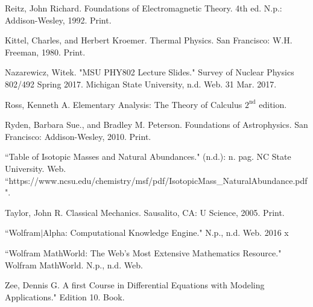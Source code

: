 {\begin{thebibliography}{99}
	 Reitz, John Richard. Foundations of Electromagnetic Theory. 4th ed. N.p.: Addison-Wesley, 1992. Print. 
	
	  Kittel, Charles, and Herbert Kroemer. Thermal Physics. San Francisco: W.H. Freeman, 1980. Print.
	
	 Nazarewicz, Witek. "MSU PHY802 Lecture Slides." Survey of Nuclear Physics 802/492 Spring 2017. Michigan State University, n.d. Web. 31 Mar. 2017. 
	
	 Ross, Kenneth A. Elementary Analysis: The Theory of Calculus $2^{\textrm{nd}}$ edition. 
	
	 Ryden, Barbara Sue., and Bradley M. Peterson. Foundations of Astrophysics. San Francisco: Addison-Wesley, 2010. Print. 
	
	 ``Table of Isotopic Masses and Natural Abundances." (n.d.): n. pag. NC State University. Web. ``https://www.ncsu.edu/chemistry/msf/pdf/IsotopicMass\_NaturalAbundance.pdf". 
	
	 Taylor, John R. Classical Mechanics. Sausalito, CA: U Science, 2005. Print. 
	
	 ``Wolfram$|$Alpha: Computational Knowledge Engine." N.p., n.d. Web. 2016 x
	
	 ``Wolfram MathWorld: The Web's Most Extensive Mathematics Resource." Wolfram MathWorld. N.p., n.d. Web. 
	
	 Zee, Dennis G. A first Course in Differential Equations with Modeling Applications." Edition 10. Book.
\end{thebibliography}
}
